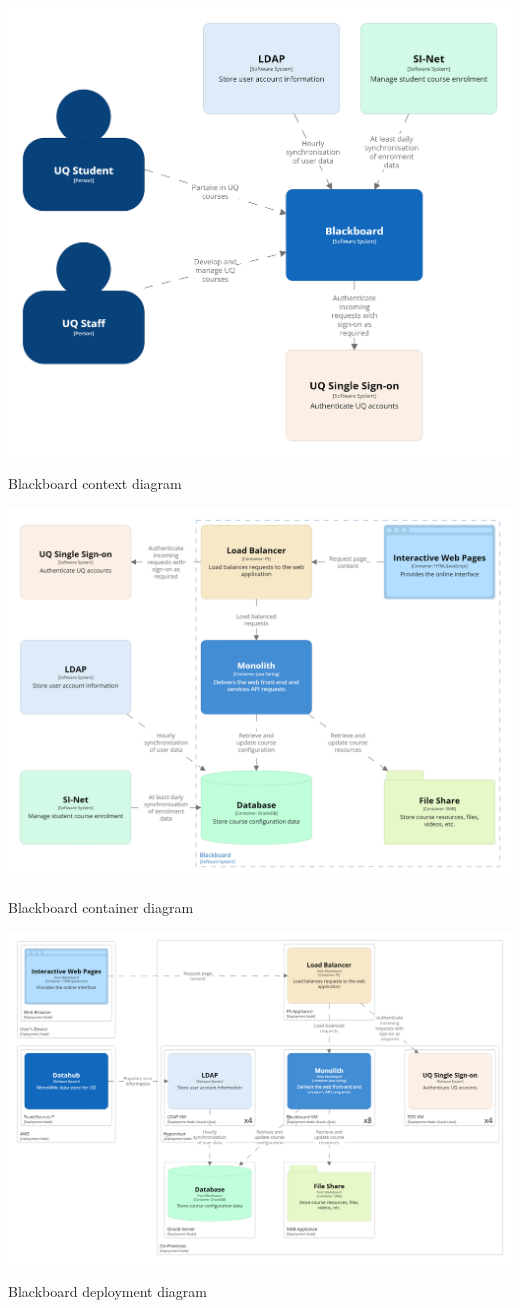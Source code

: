 \documentclass{csse4400}
\begin{document}
\centering
\includegraphics[width=\textwidth]{images/context}
\caption{Blackboard context diagram}
\vspace{2em}

\includegraphics[width=\textwidth]{images/container}
\caption{Blackboard container diagram}

\begin{adjustwidth}{-11mm}{-11mm}
\centering
\includegraphics[width=0.98\paperwidth]{images/deployment}
\caption{Blackboard deployment diagram}
\end{adjustwidth}
\end{document}
